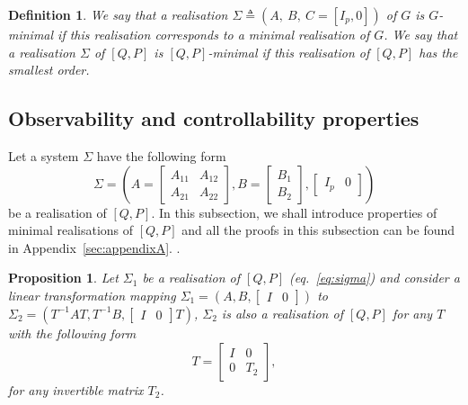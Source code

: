 \documentclass[twocolumn,12pt]{autart}
\theoremstyle{plain}
\newtheorem{proposition}{Proposition}
\newtheorem{definition}{Definition}
\begin{document}
\begin{definition}
We say that a realisation $\Sigma\triangleq(A,~B,~C=[I_p,0])$ of $G$ is ${G}$-minimal if this realisation corresponds to a minimal realisation of ${G}$. We say that a realisation $\Sigma$ of $[Q,P]$ is $[{Q},{P}]$-minimal if this realisation of $[{Q},{P}]$ has the smallest order. 
\end{definition}



\subsection{Observability and controllability properties}
Let a system $\Sigma$ have the following form
\begin{equation}\label{eq:sigma}
\Sigma=\left(A=\begin{bmatrix}{A}_{11}&{A}_{12}\\{A}_{21}&{A}_{22}\end{bmatrix},B=\begin{bmatrix}   B_1 \\B_2
\end{bmatrix},\begin{bmatrix}
I_p & 0 \end{bmatrix}\right)
\end{equation}
be a realisation of $[Q,P]$. In this subsection, we shall introduce properties of minimal realisations of $[Q,P]$ and all the proofs in this subsection can be found in Appendix~\ref{sec:appendixA}.
.




\begin{proposition}\label{lemma:tra}
Let $\Sigma_1$ be a realisation of $[Q,P]$ (eq.~\eqref{eq:sigma}) and consider a linear transformation mapping $\Sigma_1=(A,B,\begin{bmatrix} I & 0 \end{bmatrix})$ to $\Sigma_2=(T^{-1}AT,T^{-1}B,\begin{bmatrix} I & 0 \end{bmatrix}T)$,  $\Sigma_2$ is also a realisation of $[Q,P]$ for any $T$ with the following form \begin{equation}\label{eq:t}
T=\begin{bmatrix}  I & 0 \\
0 & T_2
\end{bmatrix},
\end{equation}
for any invertible matrix $T_2$.
\end{proposition} 
\end{document}
